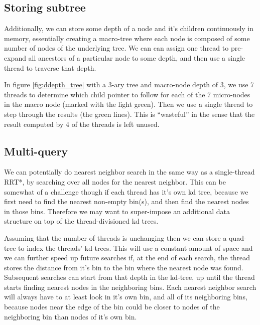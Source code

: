 \begin{figure}[H]
\begin{centering}
    \texttt{[image: \\figfile\{fig/nary\_search\_tree]}}
    \caption{$n$-ary Search Tree}
    \label{fig:nary_tree}
\end{centering}
\end{figure}

\subsection{Storing subtree}
Additionally, we can store some depth of a node and it's children continuously in memory, essentially creating a macro-tree where each node is composed of some number of nodes of the underlying tree. We can can assign one thread to pre-expand all ancestors of a particular node to some depth, and then use a single thread to traverse that depth.

 \begin{figure}[H]
\begin{centering}
    \texttt{[image: \\figfile\{fig/ddepth\_macro\_tree]}}
    \caption{$d$-depth Search Tree}
    \label{fig:ddepth_tree}
\end{centering}
\end{figure}

In figure \ref{fig:ddepth_tree} with a 3-ary tree and macro-node depth of 3, we use 7 threads to determine which child pointer to follow for each of the 7 micro-nodes in the macro node (marked with the light green). Then we use a single thread to step through the results (the green lines). This is ``wasteful'' in the sense that the result computed by 4 of the threads is left unused. 

\subsection{Multi-query}
We can potentially do nearest neighbor search in the same way as a single-thread RRT*, by searching over all nodes for the nearest neighbor. This can be somewhat of a challenge though if each thread has it's own kd tree, because we first need to find the nearest non-empty bin(s), and then find the nearest nodes in those bins. Therefore we may want to super-impose an additional data structure on top of the thread-divisioned kd trees.  

Assuming that the number of threads is unchanging then we can store a quad-tree to index the threads' kd-trees. This will use a constant amount of space and we can further speed up future searches if, at the end of each search, the thread stores the distance from it's bin to the bin where the nearest node was found. Subsequent searches can start from that depth in the kd-tree, up until the thread starts finding nearest nodes in the neighboring bins. Each nearest neighbor search will always have to at least look in it's own bin, and all of its neighboring bins, because nodes near the edge of the bin could be closer to nodes of the neighboring bin than nodes of it's own bin.


